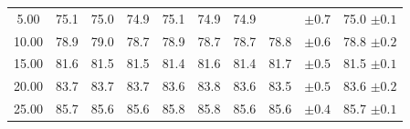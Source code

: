 \documentclass[11pt]{article}
\begin{document}
\begin{table}[h]
\begin{tabular}{cccccccccc}
5.00                                                  & 75.1                                             & 75.0                                             & 74.9                                             & 75.1                                             & 74.9                                             & 74.9                                             & \cellcolor[HTML]{C0C0C0}                         & $\pm 0.7$                                                          & 75.0 $\pm 0.1$                                                     \\
\rowcolor[HTML]{EFEFEF} 
10.00                                                 & 78.9                                             & 79.0                                             & 78.7                                             & 78.9                                             & 78.7                                             & 78.7                                             & 78.8                                             & $\pm 0.6$                                                          & 78.8  $\pm 0.2$                                                    \\
15.00                                                 & 81.6                                             & 81.5                                             & 81.5                                             & 81.4                                             & 81.6                                             & 81.4                                             & 81.7                                             & $\pm 0.5$                                                          & 81.5 $\pm 0.1$                                                     \\
\rowcolor[HTML]{EFEFEF} 
20.00                                                 & 83.7                                             & 83.7                                             & 83.7                                             & 83.6                                             & 83.8                                             & 83.6                                             & 83.5                                             & $\pm 0.5$                                                          & 83.6  $\pm 0.2$                                                    \\
25.00                                                 & 85.7                                             & 85.6                                             & 85.6                                             & 85.8                                             & 85.8                                             & 85.6                                             & 85.6                                             & $\pm 0.4$                                                          & 85.7 $\pm 0.1$                                                     \\

\end{tabular}
\end{table}
\end{document}
